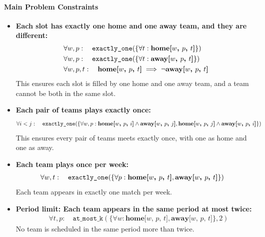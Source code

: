 \documentclass[11pt]{article}
\begin{document}
\paragraph{Main Problem Constraints}
\begin{itemize}
    \item \textbf{Each slot has exactly one home and one away team, and they are different:}
    \begin{align*}
        &\forall w, p: \quad \texttt{exactly\_one}(\{\forall t: \space \textbf{home[$w$, $p$, $t$]}\}) \\
        &\forall w, p: \quad \texttt{exactly\_one}(\{\forall t: \space \textbf{away[$w$, $p$, $t$]}\}) \\
        &\forall w, p, t: \quad \textbf{home[$w$, $p$, $t$]} \implies \neg \textbf{away[$w$, $p$, $t$]}
    \end{align*}
    This ensures each slot is filled by one home and one away team, and a team cannot be both in the same slot.

    \item \textbf{Each pair of teams plays exactly once:}
    \begin{align*}
        &\forall i < j: \quad \texttt{exactly\_one}(\{ \forall w, p: \space \textbf{home[$w$, $p$, $i$]} \land \textbf{away[$w$, $p$, $j$]}, \textbf{home[$w$, $p$, $j$]} \land \textbf{away[$w$, $p$, $i$]}\})
    \end{align*}
    This ensures every pair of teams meets exactly once, with one as home and one as away.

    \item \textbf{Each team plays once per week:}
    \begin{align*}
        &\forall w, t: \quad \texttt{exactly\_one}(\{\forall p: \space \textbf{home[$w$, $p$, $t$]}, \textbf{away[$w$, $p$, $t$]}\})
    \end{align*}
    Each team appears in exactly one match per week.

    \item \textbf{Period limit: Each team appears in the same period at most twice:}
    \begin{align*}
        &\forall t, p: \quad \texttt{at\_most\_k}(\{\forall w: \textbf{home[$w$, $p$, $t$]}, \textbf{away[$w$, $p$, $t$]}\}, 2)
    \end{align*}
    No team is scheduled in the same period more than twice.
\end{itemize}
\end{document}
